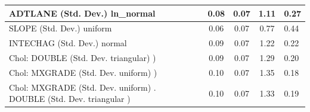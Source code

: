 \begin{table}
\begin{center}
\begin{tabular}{|l|l|c|c|c|l|}
			\hline
			ADTLANE (Std. Dev.) ln_normal &  & 0.08 & 0.07 & 1.11 & 0.27 \\
			\hline
			SLOPE (Std. Dev.) uniform &  & 0.06 & 0.07 & 0.77 & 0.44 \\
			\hline
			INTECHAG (Std. Dev.) normal &  & 0.09 & 0.07 & 1.22 & 0.22 \\
			\hline
			 Chol: DOUBLE (Std. Dev. triangular) ) &  & 0.09 & 0.07 & 1.29 & 0.20 \\
			\hline
			 Chol: MXGRADE (Std. Dev. uniform) ) &  & 0.10 & 0.07 & 1.35 & 0.18 \\
			\hline
			 Chol: MXGRADE (Std. Dev. uniform) . DOUBLE (Std. Dev.   triangular ) &  & 0.10 & 0.07 & 1.33 & 0.19 \\
			\hline
		\end{tabular}
	\end{center}
\end{table}